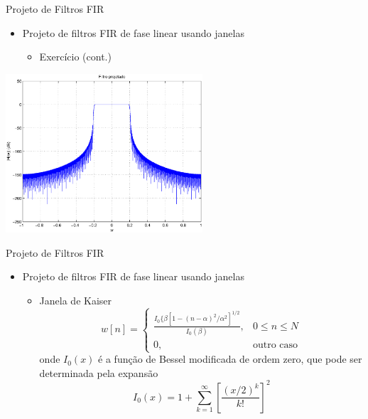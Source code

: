 \begin{slide}{Projeto de Filtros FIR}
\begin{itemize}
   \item  Projeto de filtros FIR de fase linear usando janelas 
   \begin{itemize}
      \item Exercício (cont.)
    \end{itemize}
\end{itemize}
\includegraphics[width=0.55\textwidth]{figs/Hdb.eps}
\end{slide}

\begin{slide}{Projeto de Filtros FIR}
\begin{itemize}
   \item  Projeto de filtros FIR de fase linear usando janelas 
   \begin{itemize}
      \item Janela de Kaiser
      \begin{equation*}
          w[n] = \begin{cases}
                  \frac{I_0\{\beta[1-(n-\alpha)^2/\alpha^2]^{1/2}}{I_0(\beta)}, & 0\leq n\leq N\\
                  0, & \text{outro caso}
                 \end{cases}
      \end{equation*}
      onde $I_0(x)$ \'e a fun\c c\~ao de Bessel modificada de ordem zero, que pode ser determinada pela expans\~ao
      \begin{equation*}
          I_0(x) = 1+\sum_{k=1}^{\infty}\left [ \frac{(x/2)^k}{k!}\right ]^2
      \end{equation*}
      
   \end{itemize}
\end{itemize}
\end{slide}

